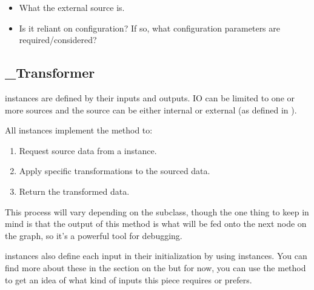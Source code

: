 \documentclass[letterpaper,10pt,english]{sphinxmanual}
\begin{document}
\begin{itemize}
\item {} 
What the external source is.

\item {} 
Is it reliant on configuration? If so, what configuration parameters are required/considered?

\end{itemize}


\subsection{\_Transformer}
\label{\detokenize{beginners-guide:transformer}}

 instances are defined by their inputs and outputs. IO can be limited to one or more sources and the source can be either internal or external (as defined in {\hyperref[\detokenize{beginners-guide:external}]{}}).

All  instances implement the  method to:
\begin{enumerate}
%
\item {} 
Request source data from a  instance.

\item {} 
Apply specific transformations to the sourced data.

\item {} 
Return the transformed data.

\end{enumerate}

This process will vary depending on the subclass, though the one thing to keep in mind is that the output of this method is what will be fed onto the next node on the graph, so it’s a powerful tool for debugging.

 instances also define each input in their initialization by using  instances. You can find more about these in the  section on the {\hyperref[\detokenize{developers-guide:validator}]{}} but for now, you can use the  method to get an idea of what kind of inputs this piece requires or prefers.
\end{document}
